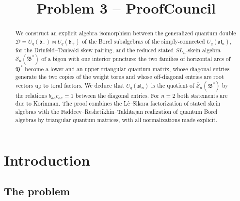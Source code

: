 \documentclass[12pt]{article}
\title{Problem 3 -- ProofCouncil}
\author{}
\date{}
\theoremstyle{remark}
\newcommand{\U}{U_q}
\newcommand{\slN}{\mathfrak{sl}_n}
\newcommand{\bp}{\mathfrak b_+}
\newcommand{\bm}{\mathfrak b_-}
\newcommand{\redS}{\overline{\mathcal S}_n}
\newcommand{\Bstar}{\mathfrak B^*}
\newcommand{\cD}{\mathcal D}
\begin{document}
\maketitle

\begin{abstract}
We construct an explicit algebra isomorphism between the generalized
quantum double $\cD=\U(\bm)\bowtie\U(\bp)$ of the Borel subalgebras of
the simply-connected $\U(\slN)$, for the Drinfeld--Tanisaki skew
pairing, and the reduced stated $SL_n$-skein algebra $\redS(\Bstar)$ of
a bigon with one interior puncture: the two families of horizontal arcs
of $\Bstar$ become a lower and an upper triangular quantum matrix, whose
diagonal entries generate the two copies of the weight torus and whose
off-diagonal entries are root vectors up to toral factors. We deduce
that $\U(\slN)$ is the quotient of $\redS(\Bstar)$ by the relations
$b_{aa}c_{aa}=1$ between the diagonal entries.
For $n=2$ both statements are due to Korinman. The proof combines the
L\^e--Sikora factorization of stated skein algebras with the
Faddeev--Reshetikhin--Takhtajan realization of quantum Borel algebras
by triangular quantum matrices, with all normalizations made explicit.
\end{abstract}

\section{Introduction}

\subsection{The problem}
\end{document}
